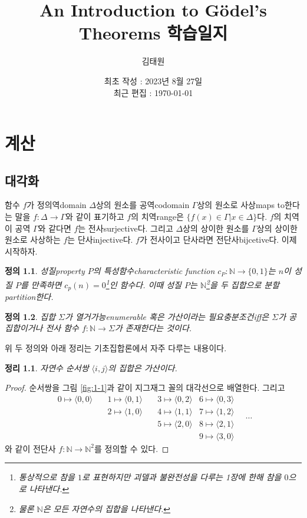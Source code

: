 \documentclass[a4paper,chapter,atbegshi]{oblivoir}
\title{\textsf{An Introduction to G\"odel's Theorems} 학습일지}
\author{김태원}
\date{최초 작성 : 2023년 8월 27일 \\ 최근 편집 : \today}
\newtheorem{defn}{정의}[chapter]
\newtheorem{theo}{정리}[chapter]
\begin{document}
\maketitle
\break
\tableofcontents
\chapter{계산}
\section{대각화}
함수 $f$가 정의역{\tiny domain} $\Delta$상의 원소를 공역{\tiny codomain} 
$\Gamma$상의 원소로 사상{\tiny maps to}한다는 말을 $f:\Delta\rightarrow\Gamma$와
같이 표기하고 $f$의 치역{\tiny range}은 $\{f(x)\in\Gamma|x\in\Delta\}$다.
$f$의 치역이 공역 $\Gamma$와 같다면 $f$는 전사{\tiny surjective}다.
그리고 $\Delta$상의 상이한 원소를 $\Gamma$상의 상이한 원소로 사상하는 $f$는
단사{\tiny injective}다. $f$가 전사이고 단사라면 전단사{\tiny bijcetive}다.
이제 시작하자.
\begin{defn}\label{defn:1-1}
성질{\tiny property} $P$의 \emph{특성함수\tiny characteristic function}
$c_P:\mathbb{N}\rightarrow\{0,1\}$는 $n$이 성질 $P$를 만족하면 
$c_p(n)=0$\footnote{통상적으로 참을 $1$로 표현하지만 괴델과 불완전성을 다루는
1장에 한해 참을 $0$으로 나타낸다.}인 함수다. 이때 성질 $P$는 
$\mathbb{N}$\footnote{물론 $\mathbb{N}$은 모든 자연수의 집합을 나타낸다.}을
두 집합으로 분할{\tiny partition}한다.
\end{defn}
\begin{defn}\label{defn:1-2}
집합 $\Sigma$가 \emph{열거가능\tiny enumerable} 혹은 \emph{가산}이라는
필요충분조건{\tiny iff}은 $\Sigma$가 공집합이거나 전사 함수 $f:\mathbb{N}
\rightarrow\Sigma$가 존재한다는 것이다. 
\end{defn}
위 두 정의와 아래 정리는 기초집합론에서 자주 다루는 내용이다.
\begin{theo}\label{theo:1-1}
  자연수 순서쌍 $\langle i,j\rangle$의 집합은 가산이다.
\end{theo}
\begin{proof}
  순서쌍을 그림 \ref{fig:1-1}과 같이 지그재그 꼴의 대각선으로 배열한다.
  그리고
  \[
  \begin{matrix}
     0\mapsto\langle0,0\rangle\quad
     &1\mapsto\langle0,1\rangle\quad
     &3\mapsto\langle0,2\rangle
     &6\mapsto\langle0,3\rangle\\
     &2\mapsto\langle1,0\rangle\quad
     &4\mapsto\langle1,1\rangle
     &7\mapsto\langle1,2\rangle\\
     &&5\mapsto\langle2,0\rangle
     &8\mapsto\langle 2,1\rangle\\
     &&&9\mapsto\langle3,0\rangle
  \end{matrix}
  \quad\cdots
  \]
  와 같이 전단사 $f:\mathbb{N}\rightarrow\mathbb{N}^2$를 정의할 수 있다.
\end{proof}
\end{document}
